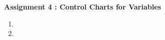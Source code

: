 \documentclass[a4 paper, 12pt]{report}
\begin{document}
\setspacing

\begin{center}
    \large \textbf{Assignment 4 : Control Charts for Variables}
\end{center}
    

\begin{enumerate}
    
    \item 
    
    \item 
    
\end{enumerate}
\end{document}
